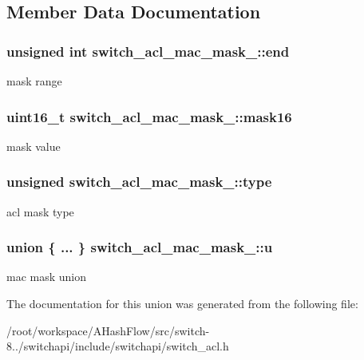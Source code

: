 \subsection{Member Data Documentation}
\hypertarget{unionswitch__acl__mac__mask___a0ca260c767c5ce11d9f8dcc95c11f4ad}{
\subsubsection[{end}]{\setlength{\rightskip}{0pt plus 5cm}unsigned int switch\+\_\+acl\+\_\+mac\+\_\+mask\+\_\+\+::end}}\label{unionswitch__acl__mac__mask___a0ca260c767c5ce11d9f8dcc95c11f4ad}
mask range \hypertarget{unionswitch__acl__mac__mask___ac479f9e886b148bceb2f1fcd5254cdbe}{
\subsubsection[{mask16}]{\setlength{\rightskip}{0pt plus 5cm}uint16\+\_\+t switch\+\_\+acl\+\_\+mac\+\_\+mask\+\_\+\+::mask16}}\label{unionswitch__acl__mac__mask___ac479f9e886b148bceb2f1fcd5254cdbe}
mask value \hypertarget{unionswitch__acl__mac__mask___a35c723a2a38a9f1df79cfafdf2afbc6b}{
\subsubsection[{type}]{\setlength{\rightskip}{0pt plus 5cm}unsigned switch\+\_\+acl\+\_\+mac\+\_\+mask\+\_\+\+::type}}\label{unionswitch__acl__mac__mask___a35c723a2a38a9f1df79cfafdf2afbc6b}
acl mask type \hypertarget{unionswitch__acl__mac__mask___a60ee86fb71434de7da92a682a671e48c}{
\subsubsection[{u}]{\setlength{\rightskip}{0pt plus 5cm}union \{ ... \}   switch\+\_\+acl\+\_\+mac\+\_\+mask\+\_\+\+::u}}\label{unionswitch__acl__mac__mask___a60ee86fb71434de7da92a682a671e48c}
mac mask union 

The documentation for this union was generated from the following file\+:\begin{DoxyCompactItemize}
\item 
/root/workspace/\+A\+Hash\+Flow/src/switch-\/8../switchapi/include/switchapi/switch\+\_\+acl.\+h\end{DoxyCompactItemize}
